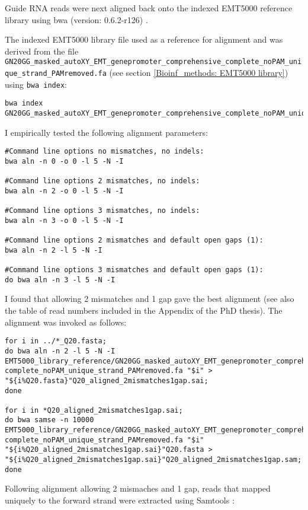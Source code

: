Guide RNA reads were next aligned back onto the indexed EMT5000 reference library using bwa (version: 0.6.2-r126) \cite{Li:2009fi}.

The indexed EMT5000 library file used as a reference for alignment and was derived from the file \verb|GN20GG_masked_autoXY_EMT_genepromoter_comprehensive_complete_noPAM_unique_strand_PAMremoved.fa| (see section \ref{Bioinf_methods: EMT5000 library}) using \verb|bwa index|:

\begin{lstlisting}
bwa index GN20GG_masked_autoXY_EMT_genepromoter_comprehensive_complete_noPAM_unique_strand_PAMremoved.fa
\end{lstlisting}

I empirically tested the following alignment parameters:

\begin{lstlisting}
#Command line options no mismatches, no indels:
bwa aln -n 0 -o 0 -l 5 -N -I

#Command line options 2 mismatches, no indels:
bwa aln -n 2 -o 0 -l 5 -N -I

#Command line options 3 mismatches, no indels:
bwa aln -n 3 -o 0 -l 5 -N -I

#Command line options 2 mismatches and default open gaps (1):
bwa aln -n 2 -l 5 -N -I  

#Command line options 3 mismatches and default open gaps (1):
do bwa aln -n 3 -l 5 -N -I
\end{lstlisting}

I found that allowing 2 mismatches and 1 gap gave the best alignment (see also the table of read numbers included in the Appendix of the PhD thesis). The alignment was invoked as follows:

\begin{lstlisting}
for i in ../*_Q20.fasta;
do bwa aln -n 2 -l 5 -N -I EMT5000_library_reference/GN20GG_masked_autoXY_EMT_genepromoter_comprehensive_
complete_noPAM_unique_strand_PAMremoved.fa "$i" > "${i%Q20.fasta}"Q20_aligned_2mismatches1gap.sai;
done

for i in *Q20_aligned_2mismatches1gap.sai;
do bwa samse -n 10000 EMT5000_library_reference/GN20GG_masked_autoXY_EMT_genepromoter_comprehensive_
complete_noPAM_unique_strand_PAMremoved.fa "$i" "${i%Q20_aligned_2mismatches1gap.sai}"Q20.fasta > "${i%Q20_aligned_2mismatches1gap.sai}"Q20_aligned_2mismatches1gap.sam;
done
\end{lstlisting}

Following alignment allowing 2 mismaches and 1 gap, reads that mapped uniquely to the forward strand were extracted using Samtools \cite{Li:2009kaa}:

